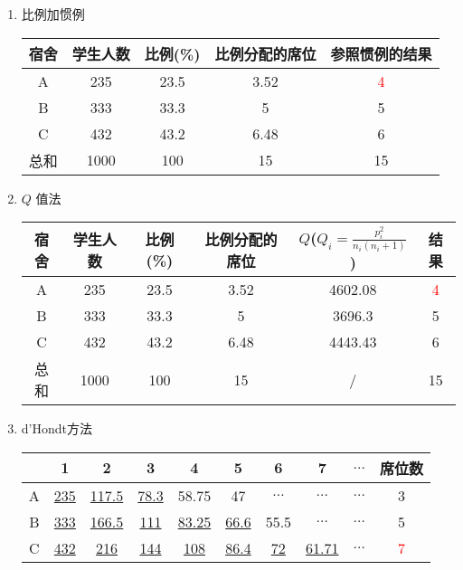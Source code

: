 \documentclass{article}
\newcommand{\red}[1]{\textcolor{red}{#1}}
\begin{document}
\begin{enumerate}
    \item 比例加惯例

    \begin{center}
        \begin{tabular}{|c|c|c|c|c|}
        \hline
        宿舍 & 学生人数 & 比例(\%) & 比例分配的席位 & 参照惯例的结果 \\
        \hline
        A & 235 & 23.5 & 3.52 & \red{4} \\
        \hline
        B & 333 & 33.3 & 5 & 5 \\
        \hline
        C & 432 & 43.2 & 6.48 & 6 \\
        \hline
        总和 & 1000 & 100 & 15 & 15 \\
        \hline
        \end{tabular}
    \end{center}
    
    \item $Q$ 值法
    \begin{center}
        \begin{tabular}{|c|c|c|c|c|c|}
        \hline
        宿舍 & 学生人数 & 比例(\%) & 比例分配的席位 & $Q$($Q_i=\frac{p_i^2}{n_i(n_i+1)}$) & 结果 \\
        \hline
        A & 235 & 23.5 & 3.52 & 4602.08 & \red{4} \\
        \hline
        B & 333 & 33.3 & 5 & 3696.3 & 5 \\
        \hline
        C & 432 & 43.2 & 6.48 & 4443.43 & 6 \\
        \hline
        总和 & 1000 & 100 & 15 & / & 15 \\
        \hline
        \end{tabular}
    \end{center}
    \item d'Hondt方法
    
    \begin{center}
        \begin{tabular}{|ccccccccc|c|}
        \hline
        & 1 & 2 & 3 & 4 & 5 & 6 &7& $\dots$ & 席位数 \\
        \hline
        A & \underline{235} & \underline{117.5} & \underline{78.3} & 58.75 & 47 & $\dots$ & $\dots$& $\dots$ & 3 \\
        B & \underline{333} & \underline{166.5} & \underline{111} & \underline{83.25} & \underline{66.6} &55.5 & $\dots$& $\dots$ & 5 \\
        C & \underline{432} & \underline{216} & \underline{144} & \underline{108} & \underline{86.4} & \underline{72} & \underline{61.71} & $\dots$ & \red{7} \\
        \hline
        \end{tabular}
    \end{center}
\end{enumerate}
\end{document}
